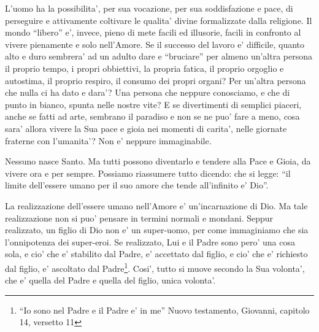 L'uomo ha la possibilita', per sua vocazione, per sua soddisfazione e pace, di perseguire e attivamente coltivare le qualita' divine formalizzate dalla religione. 
Il mondo ``libero'' e', invece, pieno di mete facili ed illusorie, facili in confronto al vivere pienamente e solo nell'Amore. Se il successo del lavoro e' difficile, quanto alto e duro sembrera' ad un adulto dare e ``bruciare'' per almeno un'altra persona il proprio tempo, i propri obbiettivi, la propria fatica, il proprio orgoglio e autostima, il proprio respiro, il consumo dei propri organi? Per un'altra persona che nulla ci ha dato e dara'? Una persona che neppure conosciamo, e che di punto in bianco, spunta nelle nostre vite? E se divertimenti di semplici piaceri, anche se fatti ad arte, sembrano il paradiso e non se ne puo' fare a meno, cosa sara' allora vivere la Sua pace e gioia nei momenti di carita', nelle giornate fraterne con l'umanita'? Non e' neppure immaginabile. 

Nessuno nasce Santo. Ma tutti possono diventarlo e tendere alla Pace e Gioia, da vivere ora e per sempre.
Possiamo riassumere tutto dicendo:
che si legge: ``il limite dell'essere umano per il suo amore che tende all'infinito e' Dio''.

La realizzazione dell'essere umano nell'Amore e' un'incarnazione di Dio. Ma tale realizzazione non si puo' pensare in termini normali e mondani. Seppur realizzato, un figlio di Dio non e' un super-uomo, per come immaginiamo che sia l'onnipotenza dei super-eroi. Se realizzato, Lui e il Padre sono pero' una cosa sola, e cio' che e' stabilito dal Padre, e' accettato dal figlio, e cio' che e' richiesto dal figlio, e' ascoltato dal Padre\footnote{``Io sono nel Padre e il Padre e' in me'' Nuovo testamento, Giovanni, capitolo 14, versetto 11}. Cosi', tutto si muove secondo la Sua volonta', che e' quella del Padre e quella del figlio, unica volonta'.

